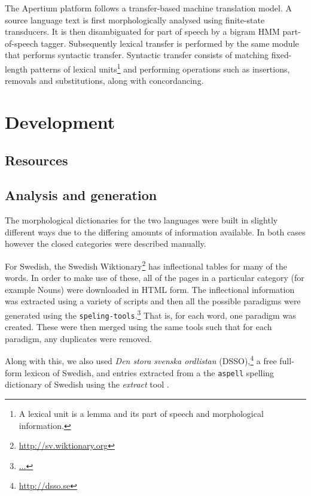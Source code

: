 \documentclass[11pt]{article}
\begin{document}
The Apertium platform follows a transfer-based machine translation model. A source
language text is first morphologically analysed using finite-state transducers. It is 
then disambiguated for part of speech by a bigram HMM part-of-speech tagger. Subsequently
lexical transfer is performed by the same module that performs syntactic transfer. Syntactic
transfer consists of matching fixed-length patterns of lexical units\footnote{A lexical unit 
is a lemma and its part of speech and morphological information.} and performing operations
such as insertions, removals and substitutions, along with concordancing.

\section{Development}

\subsection{Resources}


\subsection{Analysis and generation}


The morphological dictionaries for the two languages were built in slightly 
different ways due to the differing amounts of information available. In both
cases however the closed categories were described manually. 

For Swedish, the Swedish Wiktionary\footnote{\url{http://sv.wiktionary.org}} has
inflectional tables for many of the words. In order to make use of these, all of 
the pages in a particular category (for example Nouns) were downloaded in HTML
form. The inflectional information was extracted using a variety of scripts and 
then all the possible paradigms were generated using the {\tt\small speling-tools}.\footnote{\url{...}}
That is, for each word, one paradigm was created. These were then merged using
the same tools such that for each paradigm, any duplicates were removed. %

Along with this, we also used \emph{Den stora svenska ordlistan} (DSSO),\footnote{\url{http://dsso.se}} 
a free full-form lexicon of Swedish, and entries extracted from a the {\tt\small aspell} spelling
dictionary of Swedish using the \emph{extract} tool \citep{forsberg2006}.
\end{document}
